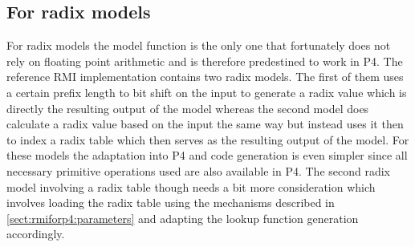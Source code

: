 \subsection{For radix models}
\label{sect:rmiforp4:radix}
For radix models the model function is the only one that fortunately does not rely on floating point arithmetic and is therefore predestined to work in P4. The reference RMI implementation contains two radix models. The first of them uses a certain prefix length to bit shift on the input to generate a radix value which is directly the resulting output of the model whereas the second model does calculate a radix value based on the input the same way but instead uses it then to index a radix table which then serves as the resulting output of the model. For these models the adaptation into P4 and code generation is even simpler since all necessary primitive operations used are also available in P4. The second radix model involving a radix table though needs a bit more consideration which involves loading the radix table using the mechanisms described in \ref{sect:rmiforp4:parameters} and adapting the lookup function generation accordingly.

